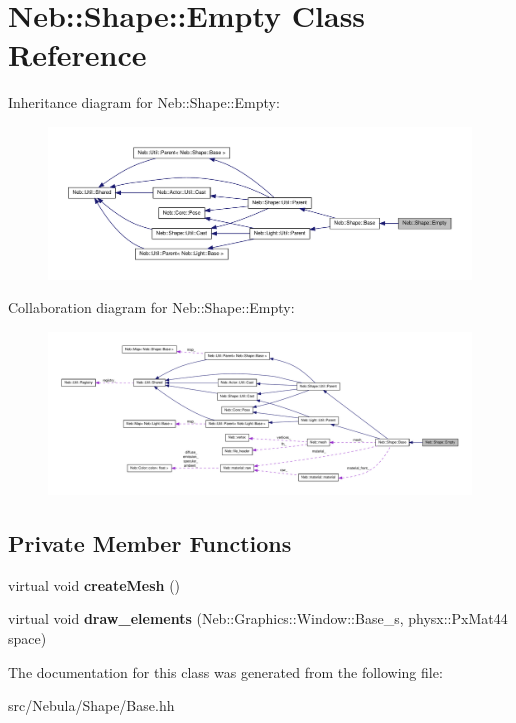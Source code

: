 \hypertarget{classNeb_1_1Shape_1_1Empty}{\section{\-Neb\-:\-:\-Shape\-:\-:\-Empty \-Class \-Reference}
\label{classNeb_1_1Shape_1_1Empty}
}


\-Inheritance diagram for \-Neb\-:\-:\-Shape\-:\-:\-Empty\-:\nopagebreak
\begin{figure}[H]
\begin{center}
\leavevmode
\includegraphics[width=350pt]{classNeb_1_1Shape_1_1Empty__inherit__graph}
\end{center}
\end{figure}


\-Collaboration diagram for \-Neb\-:\-:\-Shape\-:\-:\-Empty\-:\nopagebreak
\begin{figure}[H]
\begin{center}
\leavevmode
\includegraphics[width=350pt]{classNeb_1_1Shape_1_1Empty__coll__graph}
\end{center}
\end{figure}
\subsection*{\-Private \-Member \-Functions}
\begin{DoxyCompactItemize}
\item 
\hypertarget{classNeb_1_1Shape_1_1Empty_a558ae97f9e678d519c7c17834fa35dec}{virtual void {\bfseries create\-Mesh} ()}\label{classNeb_1_1Shape_1_1Empty_a558ae97f9e678d519c7c17834fa35dec}

\item 
\hypertarget{classNeb_1_1Shape_1_1Empty_ae026a2202ea38fa41be113f65c9f5c99}{virtual void {\bfseries draw\-\_\-elements} (\-Neb\-::\-Graphics\-::\-Window\-::\-Base\-\_\-s, physx\-::\-Px\-Mat44 space)}\label{classNeb_1_1Shape_1_1Empty_ae026a2202ea38fa41be113f65c9f5c99}

\end{DoxyCompactItemize}


\-The documentation for this class was generated from the following file\-:\begin{DoxyCompactItemize}
\item 
src/\-Nebula/\-Shape/\-Base.\-hh\end{DoxyCompactItemize}
